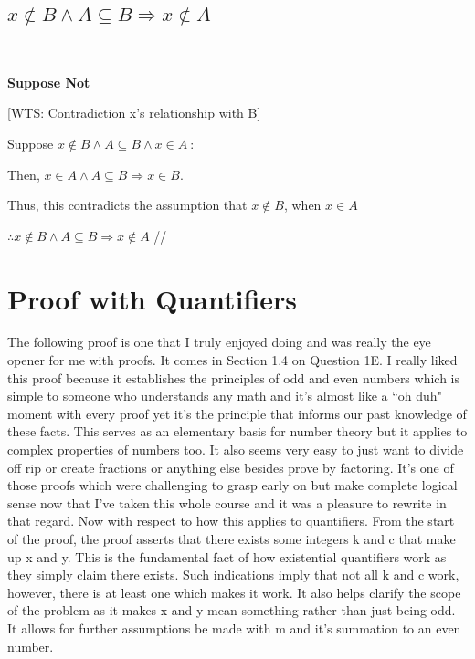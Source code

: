 \documentclass{article}
\begin{document}
\subsection{$x\notin B \wedge A \subseteq B \Rightarrow x \notin A$}
\
\begin{center}
\raggedright
\textbf{Suppose Not}

[WTS: Contradiction x's relationship with B]

Suppose $x\notin B \wedge A \subseteq B \wedge x\in A \ $:

Then,  $x \in A \wedge A \subseteq B \Rightarrow x \in B$.

Thus, this contradicts the assumption that $x \notin B$, when $x\in A $

$\therefore x\notin B \wedge A \subseteq B \Rightarrow x \notin A$  //

\end{center}
\newpage
\section{Proof with Quantifiers}
\justifying
The following proof is one that I truly enjoyed doing and was really the eye opener for me with proofs. It comes in Section 1.4 on Question 1E. I really liked this proof because it establishes the principles of odd and even numbers which is simple to someone who understands any math and it's almost like a ``oh duh" moment with every proof yet it's the principle that informs our past knowledge of these facts. This serves as an elementary basis for number theory but it applies to complex properties of numbers too. It also seems very easy to just want to divide off rip or create fractions or anything else besides prove by factoring. It's one of those proofs which were challenging to grasp early on but make complete logical sense now that I've taken this whole course and it was a pleasure to rewrite in that regard. Now with respect to how this applies to quantifiers. From the start of the proof, the proof asserts that there exists some integers k and c that make up x and y. This is the fundamental fact of how existential quantifiers work as they simply claim there exists. Such indications imply that not all k and c work, however, there is at least one which makes it work. It also helps clarify the scope of the problem as it makes x and y mean something rather than just being odd. It allows for further assumptions be made with m and it's summation to an even number.
\begin{center}
\end{center}
\end{document}
